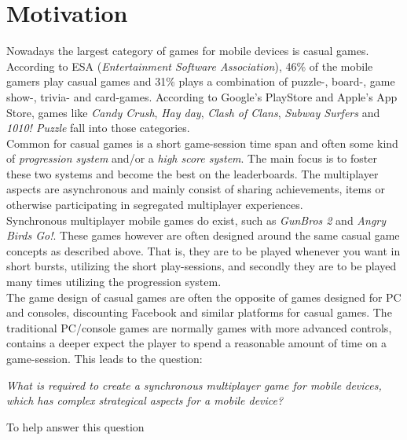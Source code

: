 \section{Motivation} \label{sec:motivation}
Nowadays the largest category of games for mobile devices is casual games. According to ESA\cite{ESA}\cite{ESApdf}
(\textit{Entertainment Software Association}), 46\% of the mobile gamers play casual games and 31\% plays a combination
of puzzle-, board-, game show-, trivia- and card-games.  According to Google's PlayStore \cite{googleplay} and Apple's
App Store\cite{appstore}, games like \textit{Candy Crush}, \textit{Hay day}, \textit{Clash of Clans}, \textit{Subway
Surfers} and \textit{1010! Puzzle} fall into those categories.\\

Common for casual games is a short game-session time span and often some kind of \textit{progression system} and/or
a \textit{high score system}. The main focus is to foster these two systems and become the best on the leaderboards.
The multiplayer aspects are asynchronous and mainly consist of sharing achievements, items or otherwise participating
in segregated multiplayer experiences.\\

Synchronous multiplayer mobile games do exist, such as \textit{GunBros 2} and \textit{Angry Birds Go!}. These games however
are often designed around the same casual game concepts as described above. That is, they are to be played whenever
you want in short bursts, utilizing the short play-sessions, and secondly they are to be played many times utilizing
the progression system.\\

The game design of casual games are often the opposite of games designed for PC and consoles, discounting Facebook
and similar platforms for casual games. The traditional PC/console games are normally games with more advanced controls, contains a deeper  expect the player to spend a reasonable amount of time on a game-session. This leads to the question:
\begin{center}\label{intro:problem_statement}
\textit{What is required to create a synchronous multiplayer game for mobile devices, which has complex strategical aspects for a mobile device?}
\end{center}

To help answer this question 


